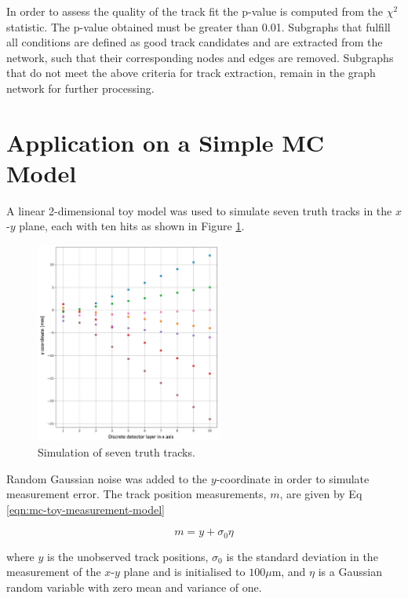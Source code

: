 In order to assess the quality of the track fit the p-value is computed from the $\chi^2$ statistic. The p-value obtained must be greater than 0.01. Subgraphs that fulfill all conditions are defined as good track candidates and are extracted from the network, such that their corresponding nodes and edges are removed. Subgraphs that do not meet the above criteria for track extraction, remain in the graph network for further processing.





\section{Application on a Simple MC Model}
\label{gnn-application-toy-model}

A linear 2-dimensional toy model was used to simulate seven truth tracks in the $x$-$y$ plane, each with ten hits as shown in Figure \ref{fig:ground-truth}. 

\begin{figure}[htbp]
    \centering
    \includegraphics[width=0.55\textwidth]{images/5-gnn-algorithm/ground-truth.png}
    \caption{Simulation of seven truth tracks.}
    \label{fig:ground-truth}%
\end{figure}

Random Gaussian noise was added to the $y$-coordinate in order to simulate measurement error. The track position measurements, $m$, are given by Eq \eqref{eqn:mc-toy-measurement-model}

\begin{equation}
m = y + \sigma_0 \eta
\label{eqn:mc-toy-measurement-model}
\end{equation}

where $y$ is the unobserved track positions, $\sigma_0$ is the standard deviation in the measurement of the $x$-$y$ plane and is initialised to $100 \mu $m, and $\eta$ is a Gaussian random variable with zero mean and variance of one.

